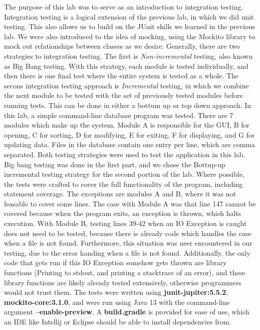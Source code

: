 The purpose of this lab was to serve as an introduction to integration testing.
Integration testing is a logical extension of the previous lab, in which we did
unit testing. This also allows us to build on the JUnit skills we learned in the
previous lab. We were also introduced to the idea of mocking, using the Mockito
library to mock out relationships between classes as we desire. Generally, there
are two strategies to integration testing. The first is \textit{Non-incremental}
testing, also known as Big Bang testing. With this strategy, each module is
tested individually, and then there is one final test where the entire system is
tested as a whole. The secons integration testing approach is
\textit{Incremental} testing, in which we combine the next module to be tested
with the set of previously tested modules before running tests. This can be done
in either a bottum up or top down approach. In this lab, a simple command-line
database program was tested. There are 7 modules which make up the system.
Module A is responsible for the GUI, B for opening, C for sorting, D for
modifying, E for exiting, F for displaying, and G for updating data. Files in
the database contain one entry per line, which are comma separated. Both testing
strategies were used to test the application in this lab. Big bang testing was
done in the first part, and we chose the Bottup-up incremental testing strategy
for the second portion of the lab. Where possible, the tests were crafted to
cover the full functionality of the program, including statement coverage. The
exceptions are modules A and B, where it was not feasable to cover some lines.
The case with Module A was that line 147 cannot be covered because when the
program exits, an exception is thrown, which halts execution. With Module B,
testing lines 39-42 when an IO Exception is caught does not need to be tested,
because there is already code which handles the case when a file is not found.
Furthermore, this situation was neer encountered in our testing, due to the
error handing when a file is not found. Additionally, the only code that gets
run if this IO Exception somehow gets thrown are library functions (Printing to
stdout, and printing a stacktrace of an error), and these library functions are
likely already tested extensively, otherwise programmers would not trust them. 
The tests were written using \textbf{junit-jupiter:5.5.2},
\textbf{mockito-core:3.1.0}, and were run using Java 13 with the command-line
argument \textbf{--enable-preview}. A \textbf{build.gradle} is provided for ease
of use, which an IDE like Intellij or Eclipse should be able to install
dependencies from. 
